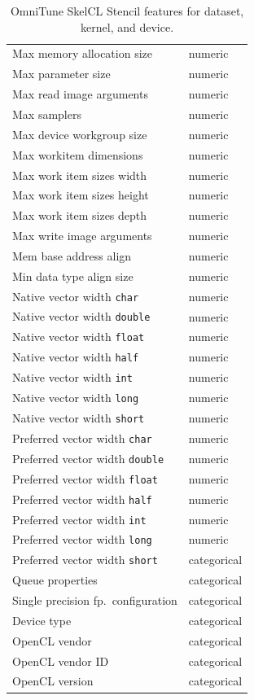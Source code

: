 \begin{table}
\begin{multicols}{2}
\begin{tabular}{p{4.5cm}p{1.3cm}}
    Max memory allocation size &      numeric \\
    Max parameter size &      numeric \\
    Max read image arguments &      numeric \\
    Max samplers &      numeric \\
    Max device workgroup size &      numeric \\
    Max workitem dimensions &      numeric \\
    Max work item sizes width &      numeric \\
    Max work item sizes height &      numeric \\
    Max work item sizes depth &      numeric \\
    Max write image arguments &      numeric \\
    Mem base address align &      numeric \\
    Min data type align size &      numeric \\
    Native vector width \texttt{char} &      numeric \\
    Native vector width \texttt{double} &      numeric \\
    Native vector width \texttt{float} &      numeric \\
    Native vector width \texttt{half} &      numeric \\
    Native vector width \texttt{int} &      numeric \\
    Native vector width \texttt{long} &      numeric \\
    Native vector width \texttt{short} &      numeric \\
    Preferred vector width \texttt{char} &      numeric \\
    Preferred vector width \texttt{double} &      numeric \\
    Preferred vector width \texttt{float} &      numeric \\
    Preferred vector width \texttt{half} &      numeric \\
    Preferred vector width \texttt{int} &      numeric \\
    Preferred vector width \texttt{long} &      numeric \\
    Preferred vector width \texttt{short} &  categorical \\
    Queue properties &  categorical \\
    Single precision fp.\ configuration &  categorical \\
    Device type &      categorical \\
    OpenCL vendor &  categorical \\
    OpenCL vendor ID &  categorical \\
    OpenCL version &  categorical \\
    \bottomrule
  \end{tabular}
\end{multicols}
\caption[OmniTune SkelCL Stencil features]{%
  OmniTune SkelCL Stencil features for dataset, kernel, and device.%
}
\label{tab:features}
\end{table}



